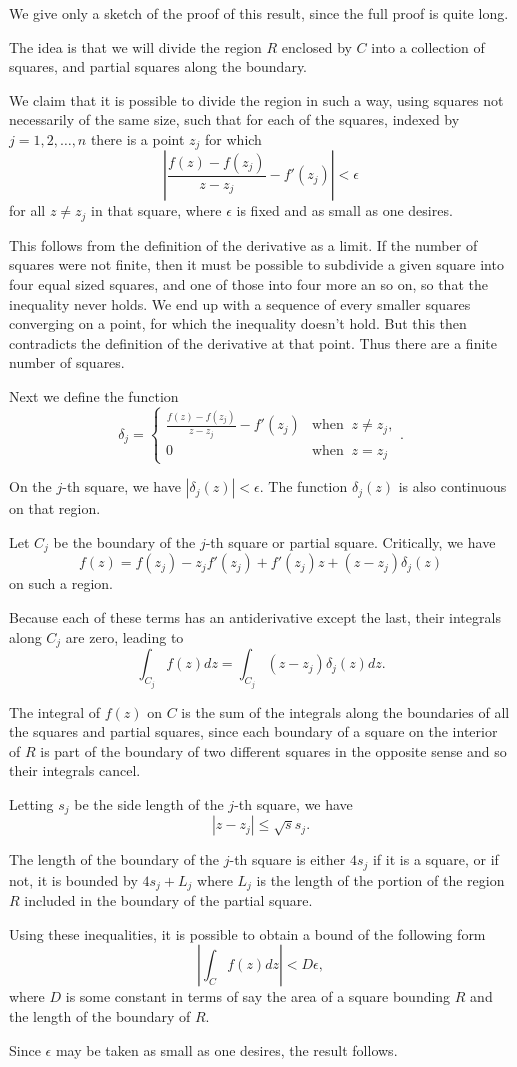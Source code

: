 \documentclass[a4paper,10pt]{article}
\begin{document}
We give only a sketch of the proof of this result, since the full proof is quite long.

The idea is that we will divide the region $R$ enclosed by $C$ into a collection of squares, and partial squares along the boundary.

We claim that it is possible to divide the region in such a way, using squares not necessarily of the same size, such that for each of the squares, indexed by $j = 1, 2, \ldots, n$ there is a point $z_j$ for which
$$\left|\frac{f(z) - f(z_j)}{z - z_j} - f'(z_j)\right| < \epsilon$$
for all $z \neq z_j$ in that square, where $\epsilon$ is fixed and as small as one desires.

This follows from the definition of the derivative as a limit. If the number of squares were not finite, then it must be possible to subdivide a given square into four equal sized squares, and one of those into four more an so on, so that the inequality never holds. We end up with a sequence of every smaller squares converging on a point, for which the inequality doesn't hold. But this then contradicts the definition of the derivative at that point. Thus there are a finite number of squares.

Next we define the function
$$\delta_j = \begin{cases}\frac{f(z) - f(z_j)}{z - z_j} - f'(z_j) & \mbox{when}\;\; z \neq z_j,\\ 0 & \mbox{when}\;\; z = z_j\end{cases}.$$

On the $j$-th square, we have $|\delta_j(z)| < \epsilon$. The function $\delta_j(z)$ is also continuous on that region.

Let $C_j$ be the boundary of the $j$-th square or partial square. Critically, we have
$$f(z) = f(z_j) - z_jf'(z_j) + f'(z_j)z + (z - z_j)\delta_j(z)$$
on such a region.

Because each of these terms has an antiderivative except the last, their integrals along $C_j$ are zero, leading to
$$\int_{C_j} f(z)dz = \int_{C_j} (z - z_j)\delta_j(z)dz.$$

The integral of $f(z)$ on $C$ is the sum of the integrals along the boundaries of all the squares and partial squares, since each boundary of a square on the interior of $R$ is part of the boundary of two different squares in the opposite sense and so their integrals cancel.

Letting $s_j$ be the side length of the $j$-th square, we have
$$|z - z_j| \leq \sqrt{s}s_j.$$

The length of the boundary of the $j$-th square is either $4s_j$ if it is a square, or if not, it is bounded by $4s_j + L_j$ where $L_j$ is the length of the portion of the region $R$ included in the boundary of the partial square.

Using these inequalities, it is possible to obtain a bound of the following form
$$\left|\int_C f(z)dz\right| < D\epsilon,$$
where $D$ is some constant in terms of say the area of a square bounding $R$ and the length of the boundary of $R$.

Since $\epsilon$ may be taken as small as one desires, the result follows.
\end{document}
